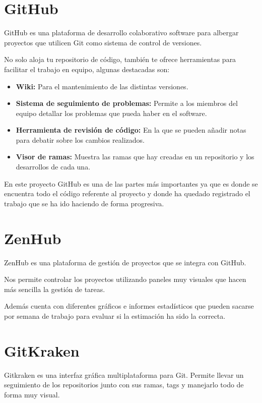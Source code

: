 \section{GitHub}
GitHub \cite{github} es una plataforma de desarrollo colaborativo software para albergar proyectos que utilicen Git como sistema de control de versiones.

No solo aloja tu repositorio de código, también te ofrece herramientas para facilitar el trabajo en equipo, algunas destacadas son:

\begin{itemize}
\tightlist
    \item\textbf{Wiki:} Para el mantenimiento de las distintas versiones.
    \item\textbf{Sistema de seguimiento de problemas:} Permite a los miembros del equipo detallar los problemas que pueda haber en el software.
    \item\textbf{Herramienta de revisión de código:} En la que se pueden añadir notas para debatir sobre los cambios realizados.
    \item\textbf{Visor de ramas:} Muestra las ramas que hay creadas en un repositorio y los desarrollos de cada una.
\end{itemize}

En este proyecto GitHub es una de las partes más importantes ya que es donde se encuentra todo el código referente al proyecto y donde ha quedado registrado el trabajo que se ha ido haciendo de forma progresiva.

\newpage
\section{ZenHub}
ZenHub \cite{zenhub} es una plataforma de gestión de proyectos que se integra con GitHub.

Nos permite controlar los proyectos utilizando paneles muy visuales que hacen más sencilla la gestión de tareas.

Además cuenta con diferentes gráficos e informes estadísticos que pueden sacarse por semana de trabajo para evaluar si la estimación ha sido la correcta.

\section{GitKraken}
Gitkraken \cite{gitkraken} es una interfaz gráfica multiplataforma para Git. Permite llevar un seguimiento de los repositorios junto con sus ramas, tags y manejarlo todo de forma muy visual.

